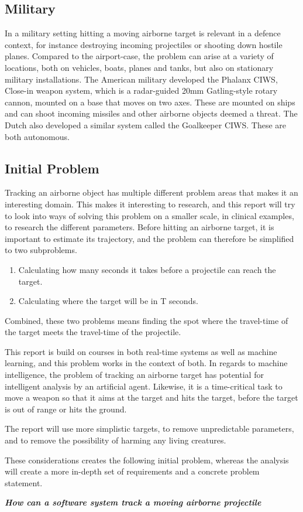 \subsection{Military}
In a military setting hitting a moving airborne target is relevant in a defence context, for instance destroying incoming projectiles or shooting down hostile planes.
Compared to the airport-case, the problem can arise at a variety of locations, both on vehicles, boats, planes and tanks, but also on stationary military installations.
The American military developed the Phalanx CIWS, Close-in weapon system, which is a radar-guided 20mm Gatling-style rotary cannon, mounted on a base that moves on two axes\cite{PhalanxCIWS}.
These are mounted on ships and can shoot incoming missiles and other airborne objects deemed a threat.
The Dutch also developed a similar system called the Goalkeeper CIWS.
These are both autonomous.

\subsection{Initial Problem}

Tracking an airborne object has multiple different problem areas that makes it an interesting domain.
This makes it interesting to research, and this report will try to look into ways of solving this problem on a smaller scale, in clinical examples, to research the different parameters.
Before hitting an airborne target, it is important to estimate its trajectory, and the problem can therefore be simplified to two subproblems.
\begin{enumerate}
  \item Calculating how many seconds it takes before a projectile can reach the target.
  \item Calculating where the target will be in T seconds.
\end{enumerate}
Combined, these two problems means finding the spot where the travel-time of the target meets the travel-time of the projectile.

This report is build on courses in both real-time systems as well as machine learning, and this problem works in the context of both.
In regards to machine intelligence, the problem of tracking an airborne target has potential for intelligent analysis by an artificial agent.
Likewise, it is a time-critical task to move a weapon so that it aims at the target and hits the target, before the target is out of range or hits the ground.

The report will use more simplistic targets, to remove unpredictable parameters, and to remove the possibility of harming any living creatures.


These considerations creates the following initial problem, whereas the analysis will create a more in-depth set of requirements and a concrete problem statement.
\label{key:initialProblem}
\begin{center}
  \textit{\textbf{How can a software system track a moving airborne projectile}}
\end{center}

